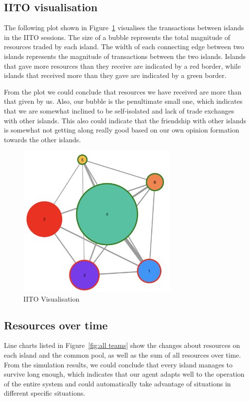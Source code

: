 \subsection{IITO visualisation} \label{subsec:Team6_Eval_IITO}
The following plot shown in Figure~\ref{fig:IITO} visualises the transactions between islands in the IITO sessions. The size of a bubble represents the total magnitude of resources traded by each island. The width of each connecting edge between two islands represents the magnitude of transactions between the two islands. Islands that gave more resources than they receive are indicated by a red border, while islands that received more than they gave are indicated by a green border.

From the plot we could conclude that resources we have received are more than that given by us. Also, our bubble is the penultimate small one, which indicates that we are somewhat inclined to be self-isolated and lack of trade exchanges with other islands. This also could indicate that the friendship with other islands is somewhat not getting along really good based on our own opinion formation towards the other islands.
\begin{figure}[htp]
    \centering
    \includegraphics[width=8cm]{14_team6_agentdesign/images/IITO.png}
    \caption{IITO Visualisation}
    \label{fig:IITO}
\end{figure}

\subsection{Resources over time} \label{subsec:Team6_Eval_Resources}

Line charts listed in Figure~\ref{fig:all teams} show the changes about resources on each island and the common pool, as well as the sum of all resources over time. From the simulation results, we could conclude that every island manages to survive long enough, which indicates that our agent adapts well to the operation of the entire system and could automatically take advantage of situations in different specific situations. 

